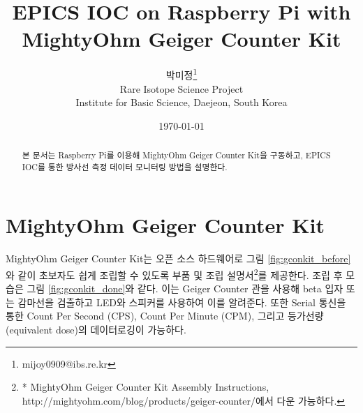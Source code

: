 \documentclass[11pt
  , a4paper
  , article
  , oneside
]{memoir}
\begin{document}
\newcommand{\technumber}{
  RAON Control-Document Series\\
  Revision : v1.0,   Release : Nov. 04. 2015}
\title{\textbf{EPICS IOC on Raspberry Pi with MightyOhm Geiger Counter Kit}}

\author{박미정\thanks{mijoy0909@ibs.re.kr} \\

  Rare Isotope Science Project\\
  Institute for Basic Science, Daejeon, South Korea
}
\date{\today}

\renewcommand{\maketitlehooka}{\begin{flushright}\textsf{\technumber}\end{flushright}}

\maketitle

\begin{abstract}
본 문서는 Raspberry Pi를 이용해 MightyOhm Geiger Counter Kit을 구동하고, EPICS IOC를 통한 방사선 측정 데이터 모니터링 방법을 설명한다.
\end{abstract}

\chapter{MightyOhm Geiger Counter Kit}
MightyOhm Geiger Counter Kit는 오픈 소스 하드웨어로 그림 \ref{fig:gconkit_before}와 같이 초보자도 쉽게 조립할 수 있도록 부품 및 조립 설명서\footnote{* MightyOhm Geiger Counter Kit
Assembly Instructions, http://mightyohm.com/blog/products/geiger-counter/에서 다운 가능하다.}를 제공한다. 조립 후 모습은 그림 \ref{fig:gconkit_done}와 같다. 이는 Geiger Counter 관을 사용해 beta 입자 또는 감마선을 검출하고 LED와 스피커를 사용하여 이를 알려준다.  또한  Serial 통신을 통한 Count Per Second (CPS), Count Per Minute (CPM), 그리고 등가선량(equivalent dose)의 데이터로깅이 가능하다\citep{gconkit}. 
\end{document}
